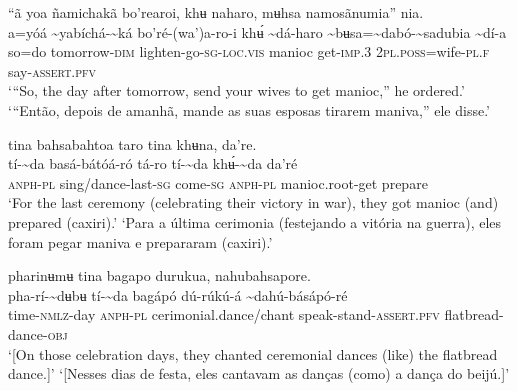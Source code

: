 \documentclass[output=paper,
modfonts,nonflat
]{langsci/langscibook}
\begin{document}
 
\ea “ã yoa ñamichakã bo'rearoi, khʉ naharo, mʉhsa namosãnumia” nia.\\[.3em]
\gll {\textasciitilde}a=yóá	{\textasciitilde}yabíchá-{\textasciitilde}ká	bo'ré-(wa')a-ro-i	khʉ́{\footnotemark}	{\textasciitilde}dá-haro {\textasciitilde}bʉsa={\textasciitilde}dabó-{\textasciitilde}sadubia	{\textasciitilde}dí-a\\
     so=do	tomorrow\textsc{-dim}	lighten-go\textsc{-sg-loc.vis}	manioc	get-\textsc{imp.3} 2\textsc{pl.poss}=wife\textsc{-pl.f}	say-\textsc{assert.pfv}\\
\glt ‘“So, the day after tomorrow, send your wives to get manioc,” he ordered.’
\glt ‘“Então, depois de amanhã, mande as suas esposas tirarem maniva,” ele disse.’
\z 

\ea tina bahsabahtoa taro tina khʉna, da're.\\[.3em]
\gll tí-{\textasciitilde}da	basá-bátóá-ró	tá-ro	tí-{\textasciitilde}da	khʉ́-{\textasciitilde}da	da'ré \\
     \textsc{anph-pl}	sing/dance-last\textsc{-sg}	come\textsc{-sg}	\textsc{anph-pl}	manioc.root-get	prepare\\
\glt ‘For the last ceremony (celebrating their victory in war), they got manioc (and) prepared (caxiri).'{\footnotemark}
\glt ‘Para a última cerimonia (festejando a vitória na guerra), eles foram pegar maniva e prepararam (caxiri).’
\z 

\newpage 
\ea pharinʉmʉ tina bagapo durukua, nahubahsapore.\\[.3em]
\gll pha-rí-{\textasciitilde}dʉbʉ	tí-{\textasciitilde}da	bagápó	dú-rúkú-á	{\textasciitilde}dahú-básápó-ré \\
     time\textsc{-nmlz}-day	\textsc{anph-pl}	cerimonial.dance/chant	speak-stand-\textsc{assert.pfv}	flatbread-dance\textsc{-obj}\\
\glt ‘[On those celebration days, they chanted ceremonial dances (like) the flatbread dance.]’
\glt ‘[Nesses dias de festa, eles cantavam as danças (como) a dança do beijú.]’
\z 
\end{document}
